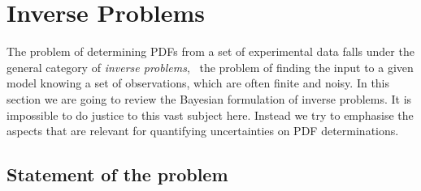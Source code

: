 
\section{Inverse Problems}
\label{sec:inverse-problems}

The problem of determining PDFs from a set of experimental data falls under the
general category of {\em inverse problems}, \ie\ the problem of finding the
input to a given model knowing a set of observations, which are often finite and
noisy. In this section we are going to review the Bayesian formulation of
inverse problems. It is impossible to do justice to this vast subject here.
Instead we try to emphasise the aspects that are relevant for quantifying
uncertainties on PDF determinations. 

\subsection{Statement of the problem}
\label{sec:BayesianInverse}

